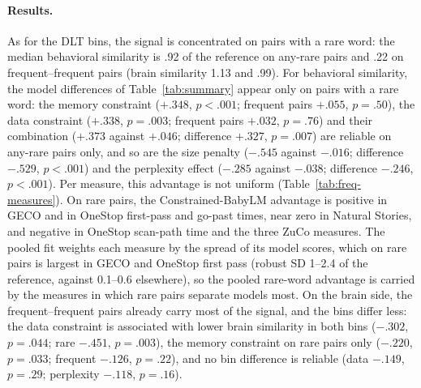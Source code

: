 \paragraph{Results.} As for the DLT bins, the signal is concentrated on pairs with a rare word: the median behavioral similarity is .92 of the reference on any-rare pairs and .22 on frequent--frequent pairs (brain similarity 1.13 and .99). For behavioral similarity, the model differences of Table~\ref{tab:summary} appear only on pairs with a rare word: the memory constraint ($+.348$, $p<.001$; frequent pairs $+.055$, $p=.50$), the data constraint ($+.338$, $p=.003$; frequent pairs $+.032$, $p=.76$) and their combination ($+.373$ against $+.046$; difference $+.327$, $p=.007$) are reliable on any-rare pairs only, and so are the size penalty ($-.545$ against $-.016$; difference $-.529$, $p<.001$) and the perplexity effect ($-.285$ against $-.038$; difference $-.246$, $p<.001$). Per measure, this advantage is not uniform (Table~\ref{tab:freq-measures}). On rare pairs, the Constrained-BabyLM advantage is positive in GECO and in OneStop first-pass and go-past times, near zero in Natural Stories, and negative in OneStop scan-path time and the three ZuCo measures. The pooled fit weights each measure by the spread of its model scores, which on rare pairs is largest in GECO and OneStop first pass (robust SD 1--2.4 of the reference, against 0.1--0.6 elsewhere), so the pooled rare-word advantage is carried by the measures in which rare pairs separate models most. On the brain side, the frequent--frequent pairs already carry most of the signal, and the bins differ less: the data constraint is associated with lower brain similarity in both bins ($-.302$, $p=.044$; rare $-.451$, $p=.003$), the memory constraint on rare pairs only ($-.220$, $p=.033$; frequent $-.126$, $p=.22$), and no bin difference is reliable (data $-.149$, $p=.29$; perplexity $-.118$, $p=.16$).



